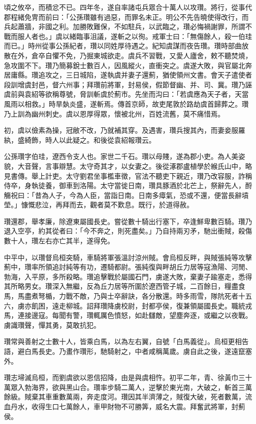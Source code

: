\begin{pinyinscope}
頃之攸卒，而積忿不已。四年冬，遂自率諸屯兵眾合十萬人以攻瓚。將行，從事代郡程緒免冑而前曰：「公孫瓚雖有過惡，而罪名未正。明公不先告曉使得改行，而兵起蕭牆，非國之利。加勝敗難保，不如駐兵，以武臨之，瓚必悔禍謝罪，所謂不戰而服人者也。」虞以緒臨事沮議，遂斬之以徇。戒軍士曰：「無傷餘人，殺一伯珪而已。」時州從事公孫紀者，瓚以同姓厚待遇之。紀知虞謀而夜告瓚。瓚時部曲放散在外，倉卒自懼不免，乃掘東城欲走。虞兵不習戰，又愛人廬舍，敕不聽焚燒，急攻圍不下。瓚乃簡募銳士數百人，因風縱火，直衝突之。虞遂大敗，與官屬北奔居庸縣。瓚追攻之，三日城陷，遂執虞并妻子還薊，猶使領州文書。會天子遣使者段訓增虞封邑，督六州事；拜瓚前將軍，封易侯，假節督幽、并、司、冀。瓚乃誣虞前與袁紹等欲稱尊號，脅訓斬虞於薊市。先坐而沟曰：「若虞應為天子者，天當風雨以相救。」時旱埶炎盛，遂斬焉。傳首京師，故吏尾敦於路劫虞首歸葬之。瓚乃上訓為幽州刺史。虞以恩厚得眾，懷被北州，百姓流舊，莫不痛惜焉。

初，虞以儉素為操，冠敝不改，乃就補其穿。及遇害，瓚兵搜其內，而妻妾服羅紈，盛綺飾，時人以此疑之。和後從袁紹報瓚云。

公孫瓚字伯珪，遼西令支人也。家世二千石。瓚以母賤，遂為郡小吏。為人美姿貌，大音聲，言事辯慧。太守奇其才，以女妻之。後從涿郡盧植學於緱氏山中，略見書傳。舉上計吏。太守劉君坐事檻車徵，官法不聽吏下親近，瓚乃改容服，詐稱侍卒，身執徒養，御車到洛陽。太守當徙日南，瓚具豚酒於北芒上，祭辭先人，酹觴祝曰：「昔為人子，今為人臣，當詣日南。日南多瘴氣，恐或不還，便當長辭墳塋。」慷慨悲泣，再拜而去，觀者莫不歎息。既行，於道得赦。

瓚還郡，舉孝廉，除遼東屬國長史。嘗從數十騎出行塞下，卒逢鮮卑數百騎。瓚乃退入空亭，約其從者曰：「今不奔之，則死盡矣。」乃自持兩刃矛，馳出衝賊，殺傷數十人，瓚左右亦亡其半，遂得免。

中平中，以瓚督烏桓突騎，車騎將軍張溫討涼州賊。會烏桓反畔，與賊張純等攻擊薊中，瓚率所領追討純等有功，遷騎都尉。張純復與畔胡丘力居等寇漁陽、河閒、勃海，入平原，多所殺略。瓚追擊戰於屬國石門，虜遂大敗，棄妻子踰塞走，悉得其所略男女。瓚深入無繼，反為丘力居等所圍於遼西管子城，二百餘日，糧盡食馬，馬盡煮弩楯，力戰不敵，乃與士卒辭訣，各分散還。時多雨雪，隊阬死者十五六，虜亦飢困，遠走柳城。詔拜瓚降虜校尉，封都亭侯，復兼領屬國長史。職統戎馬，連接邊寇。每聞有警，瓚輒厲色憤怒，如赴讎敵，望塵奔逐，或繼之以夜戰。虜識瓚聲，憚其勇，莫敢抗犯。

瓚常與善射之士數十人，皆乘白馬，以為左右翼，自號「白馬義從」。烏桓更相告語，避白馬長史。乃畫作瓚形，馳騎射之，中者咸稱萬歲。虜自此之後，遂遠竄塞外。

瓚志埽滅烏桓，而劉虞欲以恩信招降，由是與虞相忤。初平二年，青、徐黃巾三十萬眾入勃海界，欲與黑山合。瓚率步騎二萬人，逆擊於東光南，大破之，斬首三萬餘級。賊棄其車重數萬兩，奔走度河。瓚因其半濟薄之，賊復大破，死者數萬，流血丹水，收得生口七萬餘人，車甲財物不可勝筭，威名大震。拜奮武將軍，封薊侯。


\end{pinyinscope}
